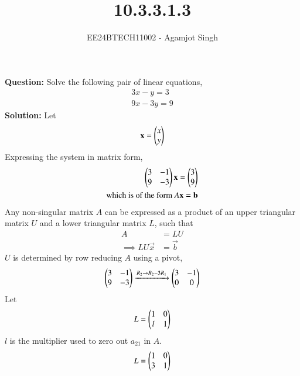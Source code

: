 \documentclass[journal]{IEEEtran}
\begin{document}

\vspace{3cm}

\title{10.3.3.1.3}
\author{EE24BTECH11002 - Agamjot Singh}
{\let\newpage\relax\maketitle}

\renewcommand{\thefigure}{\theenumi}
\renewcommand{\thetable}{\theenumi}
\setlength{\intextsep}{10pt} %

\textbf{Question:}
\newline
Solve the following pair of linear equations,
\begin{align}
    3x - y = 3\\
    9x - 3y = 9
\end{align}
\textbf{Solution:}
\newline
Let
\begin{align}
    \mathbf{x} = \begin{pmatrix}x\\y\end{pmatrix}
\end{align}
Expressing the system in matrix form,
\begin{align}
    \begin{pmatrix}3 & -1\\9 & -3\end{pmatrix}\mathbf{x} = \begin{pmatrix}3\\9\end{pmatrix}\\
    \text{which is of the form } A\mathbf{x} = \mathbf{b}
\end{align}
Any non-singular matrix $A$ can be expressed as a product of an upper triangular matrix $U$ and a lower triangular matrix $L$, such that
\begin{align}
    A &= LU\\
    \implies LU\vec{x} &= \vec{b}
\end{align}
$U$ is determined by row reducing $A$ using a pivot,
\begin{align}
    \begin{pmatrix}3 & -1\\9 & -3\end{pmatrix} \xrightarrow{R_2 \to R_2 - 3R_1} \begin{pmatrix}3 & -1\\0 & 0\end{pmatrix}
\end{align}
Let 
\begin{align}
    L = \begin{pmatrix}1 & 0\\l & 1\end{pmatrix}
\end{align}
$l$ is the multiplier used to zero out $a_{21}$ in $A$.
\begin{align}
    L = \begin{pmatrix}1 & 0\\3 & 1\end{pmatrix}
\end{align}
\end{document}
